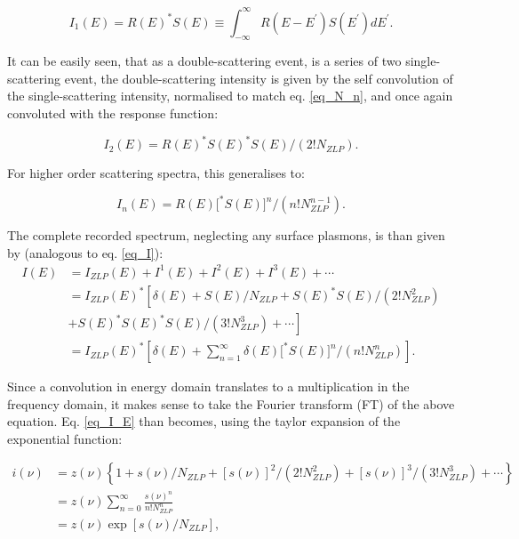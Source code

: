 \begin{equation} \label{eq_I_1}
    I_{1}(E)=R(E)^{*} S(E) \equiv \int_{-\infty}^{\infty} R\left(E-E^{\prime}\right) S\left(E^{\prime}\right) d E^{\prime}.
\end{equation}


It can be easily seen, that as a double-scattering event, is a series of two single-scattering event, the double-scattering intensity is given by the self convolution of the single-scattering intensity, normalised to match eq. \eqref{eq_N_n}, and once again convoluted with the response function:

\begin{equation}
    I_{2}(E)=R(E)^{*} S(E)^{*} S(E) /\left(2 ! N_{ZLP}\right).
\end{equation}

For higher order scattering spectra, this generalises to:


\begin{equation} \label{eq_def_I_n}
    I_{n}(E)=R(E)\big[^{*} S(E)\big]^{n} /\left(n ! N_{ZLP}^{n-1}\right).
\end{equation}

The complete recorded spectrum, neglecting any surface plasmons, is than given by (analogous to eq. \eqref{eq_I}):
\begin{equation} \label{eq_I_E}
    \begin{aligned}
        I(E) &=I_{ZLP}(E)+I^{1}(E)+I^{2}(E)+I^{3}(E)+\cdots \\
        &=I_{ZLP}(E)^{*}\left[\delta(E)+S(E) / N_{ZLP}+S(E)^{*} S(E) /\left(2 ! N_{ZLP}^{2}\right)\right.\\
        &\left.+S(E)^{*} S(E)^{*} S(E) /\left(3 ! N_{ZLP}^{3}\right)+\cdots\right]\\
        &= I_{ZLP}(E)^{*}\left[\delta(E)+ \sum_{n=1}^\infty \delta(E)\big[^{*} S(E)\big]^{n} /\left(n ! N_{ZLP}^{n}\right) \right].
        \end{aligned}
\end{equation}

Since a convolution in energy domain translates to a multiplication in the frequency domain, it makes sense to take the Fourier transform (FT) of the above equation. Eq. \eqref{eq_I_E} than becomes, using the taylor expansion of the exponential function:

\begin{equation}\label{eq_i_nu_exp}
    \begin{aligned}
i(\nu) &=z(\nu)\left\{1+s(\nu) / N_{ZLP}+[s(\nu)]^{2} /\left(2 ! N_{ZLP}^{2}\right)+[s(\nu)]^{3} /\left(3 ! N_{ZLP}^{3}\right)+\cdots\right\} \\
&=z(\nu)\sum_{n=0}^\infty\frac{s(\nu)^n}{n! N_{ZLP}^n}\\
&=z(\nu) \exp \left[s(\nu) / N_{ZLP}\right],
\end{aligned}
\end{equation}

